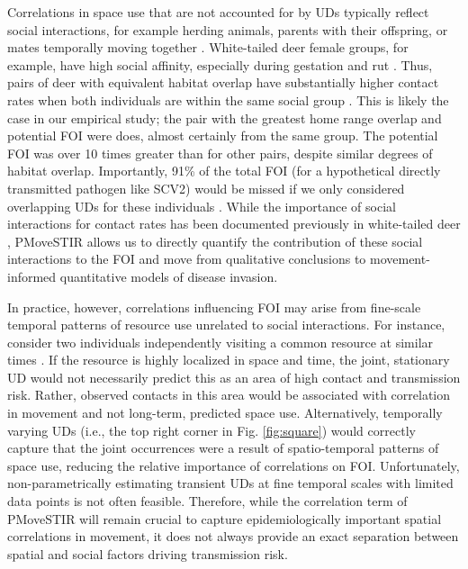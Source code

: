 \documentclass[letterpaper]{article}
\begin{document}

Correlations in space use that are not accounted for by UDs typically reflect social interactions, for example
herding animals, parents with their offspring, or mates temporally moving together \citep{Scharf2016,Yang2021}. 
White-tailed deer female groups, for example, have high social affinity, especially during gestation and rut \citep{Koen2017}. Thus, pairs of deer with equivalent habitat overlap have substantially higher contact rates when both individuals are within the same social group \citep{Schauber2007a,Kjaer2008,Schauber2015a,Grear2010}. This is likely the case in our empirical study; the pair with the greatest home range overlap and potential FOI were does, almost certainly from the same group. The potential FOI was over 10 times greater than for other pairs, despite similar degrees of habitat overlap. Importantly, 91\% of the total FOI (for a hypothetical directly transmitted pathogen like SCV2) would be missed if we only considered overlapping UDs for these individuals \citep[e.g., using a metric like CDE][]{Noonan2021}. While the importance of social interactions for contact rates has been documented previously in white-tailed deer \citep{Grear2010,Schauber2015a}, PMoveSTIR allows us to directly quantify the contribution of these social interactions to the FOI and move from qualitative conclusions to movement-informed quantitative models of disease invasion.

In practice, however, correlations influencing FOI may arise from fine-scale temporal patterns of resource use unrelated to social interactions. For instance, consider two individuals independently visiting a common resource at similar times \citep[e.g., a watering hole,][]{VanderWaal2017}. If the resource is highly localized in space and time, the joint, stationary UD would not necessarily predict this as an area of high contact and transmission risk. Rather, observed contacts in this area would be associated with correlation in movement and not long-term, predicted space use.
Alternatively, temporally varying UDs (i.e., the top right corner in Fig. \ref{fig:square}) would correctly capture that the joint occurrences were a result of spatio-temporal patterns of space use, reducing the relative importance of correlations on FOI. Unfortunately, non-parametrically estimating transient UDs at fine temporal scales with limited data points is not often feasible. Therefore, while the correlation term of PMoveSTIR will remain crucial to capture epidemiologically important spatial correlations in movement, it does not always provide an exact separation between spatial and social factors driving transmission risk.
\end{document}
